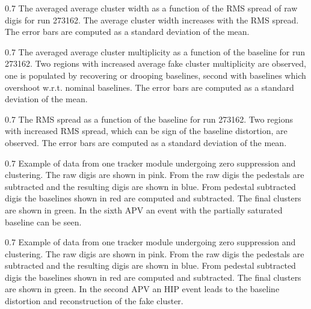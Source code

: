                  {0.7}       %
                 {The averaged average cluster width as a function of the RMS spread of raw digis for run 273162. The average cluster width increases with the RMS spread. The error bars are computed as a standard deviation of the mean. } %

                 {0.7}       %
                 {The averaged average cluster multiplicity as a function of the baseline for run 273162. Two regions with increased average fake cluster multiplicity are observed, one is populated by recovering or drooping baselines, second with baselines which overshoot w.r.t. nominal baselines.  The error bars are computed as a standard deviation of the mean. } %


                 {0.7}       %
                 {The RMS spread as a function of the baseline for run 273162. Two regions with increased RMS spread, which can be sign of the baseline distortion, are observed.  The error bars are computed as a standard deviation of the mean. } %


                 {0.7}       %
                 {Example of data from one tracker module undergoing zero suppression and clustering. The raw digis are shown in pink. From the raw digis the pedestals are subtracted and the resulting digis are shown in blue. From pedestal subtracted digis the baselines shown in red are computed and subtracted. The final clusters are shown in green. In the sixth APV an event with the partially saturated baseline can be seen.} %

                 {0.7}       %
                 {Example of data from one tracker module undergoing zero suppression and clustering. The raw digis are shown in pink. From the raw digis the pedestals are subtracted and the resulting digis are shown in blue. From pedestal subtracted digis the baselines shown in red are computed and subtracted. The final clusters are shown in green. In the second APV an HIP event leads to the baseline distortion and reconstruction of the fake cluster.} %

